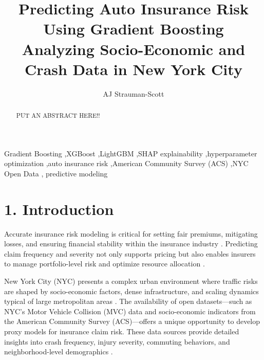\documentclass[
  number,
  review,
  3p]{elsarticle}
\begin{document}
\begin{frontmatter}
\title{Predicting Auto Insurance Risk Using Gradient
Boosting \\\large{Analyzing Socio-Economic and Crash Data in New York
City} }
\author[1]{AJ Strauman-Scott%
%
}



        
\begin{abstract}
PUT AN ABSTRACT HERE!!
\end{abstract}





\begin{keyword}
    Gradient Boosting \sep XGBoost \sep LightGBM \sep SHAP
explainability \sep hyperparameter optimization \sep auto insurance
risk \sep American Community Survey (ACS) \sep NYC Open Data \sep 
    predictive modeling
\end{keyword}
\end{frontmatter}
    

\section{1. Introduction}\label{introduction}

Accurate insurance risk modeling is critical for setting fair premiums,
mitigating losses, and ensuring financial stability within the insurance
industry \citep[\citep{clemente}]{henckaerts}. Predicting claim
frequency and severity not only supports pricing but also enables
insurers to manage portfolio-level risk and optimize resource allocation
\citep{mohamed}.

New York City (NYC) presents a complex urban environment where traffic
risks are shaped by socio-economic factors, dense infrastructure, and
scaling dynamics typical of large metropolitan areas
\citep[\citep{bettencourt}]{cabrera}. The availability of open
datasets---such as NYC's Motor Vehicle Collision (MVC) data and
socio-economic indicators from the American Community Survey
(ACS)---offers a unique opportunity to develop proxy models for
insurance claim risk. These data sources provide detailed insights into
crash frequency, injury severity, commuting behaviors, and
neighborhood-level demographics \citep[\citep{brubacher}]{adeniyi}.
\end{document}
